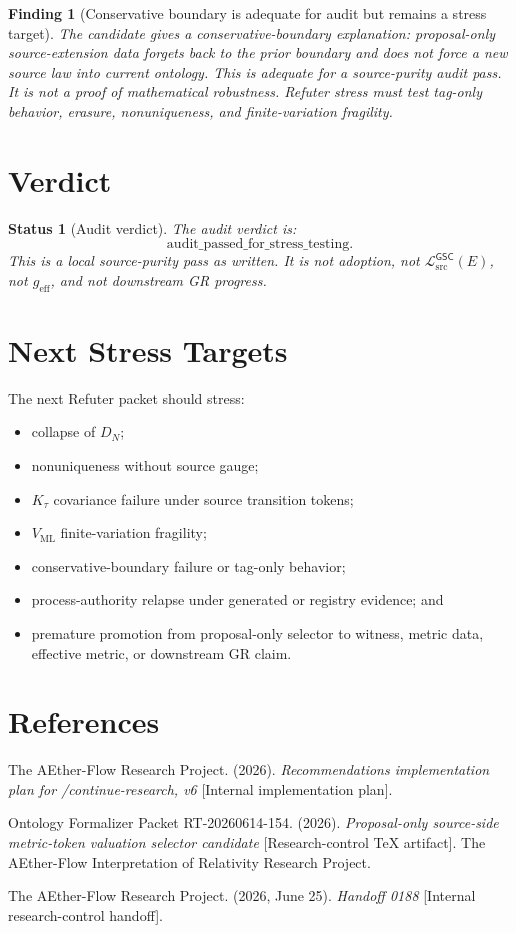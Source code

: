 \documentclass[11pt]{article}
\newcommand{\MetricData}{\mathcal{L}_{\mathrm{src}}^{\mathsf{GSC}}}
\newcommand{\geff}{g_{\mathrm{eff}}}
\newtheorem{finding}{Finding}
\newtheorem{status}{Status}
\begin{document}
\begin{finding}[Conservative boundary is adequate for audit but remains a stress target]
The candidate gives a conservative-boundary explanation: proposal-only
source-extension data forgets back to the prior boundary and does not force a
new source law into current ontology. This is adequate for a source-purity
audit pass. It is not a proof of mathematical robustness. Refuter stress must
test tag-only behavior, erasure, nonuniqueness, and finite-variation
fragility.
\end{finding}

\section{Verdict}

\begin{status}[Audit verdict]
The audit verdict is:
\[
  \mathrm{audit\_passed\_for\_stress\_testing}.
\]
This is a local source-purity pass as written. It is not adoption, not
\(\MetricData(E)\), not \(\geff\), and not downstream GR progress.
\end{status}

\section{Next Stress Targets}

The next Refuter packet should stress:
\begin{itemize}[leftmargin=*]
  \item collapse of \(D_N\);
  \item nonuniqueness without source gauge;
  \item \(K_{\tau}\) covariance failure under source transition tokens;
  \item \(V_{\mathrm{ML}}\) finite-variation fragility;
  \item conservative-boundary failure or tag-only behavior;
  \item process-authority relapse under generated or registry evidence; and
  \item premature promotion from proposal-only selector to witness, metric
  data, effective metric, or downstream GR claim.
\end{itemize}

\section{References}

The AEther-Flow Research Project. (2026). \emph{Recommendations
implementation plan for /continue-research, v6} [Internal implementation
plan].

Ontology Formalizer Packet RT-20260614-154. (2026). \emph{Proposal-only
source-side metric-token valuation selector candidate} [Research-control TeX
artifact]. The AEther-Flow Interpretation of Relativity Research Project.

The AEther-Flow Research Project. (2026, June 25). \emph{Handoff 0188}
[Internal research-control handoff].
\end{document}
